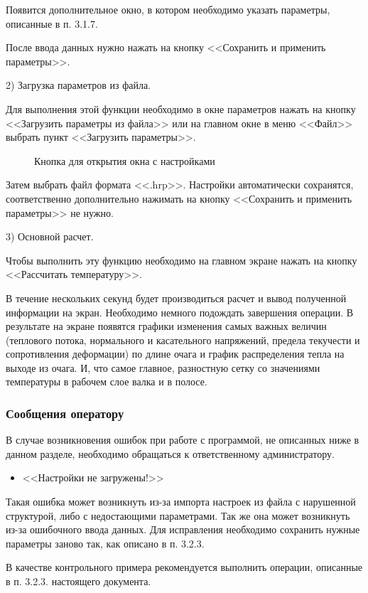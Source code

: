 Появится дополнительное окно, в котором необходимо указать параметры, описанные в п. 3.1.7.

После ввода данных нужно нажать на кнопку <<Сохранить и применить параметры>>.

2) Загрузка параметров из файла.

Для выполнения этой функции необходимо в окне параметров нажать на кнопку <<Загрузить параметры из файла>> или на главном окне в меню <<Файл>> выбрать пункт <<Загрузить параметры>>.

\begin{figure}[h] 
\label{21} 
\begin{minipage}[h]{0.49\linewidth} 
\center{\texttt{[image: 20]} \\} 
\end{minipage} 
\hfill 
\begin{minipage}[h]{0.49\linewidth} 
\center{\texttt{[image: 21]} \\ } 
\end{minipage} 
\caption{Кнопка для открытия окна с настройками} 
\end{figure}

Затем выбрать файл формата <<.hrp>>. Настройки автоматически сохранятся, соответственно дополнительно нажимать на кнопку <<Сохранить и применить параметры>> не нужно.

3) Основной расчет.

Чтобы выполнить эту функцию необходимо на главном экране нажать на кнопку <<Рассчитать температуру>>.

В течение нескольких секунд будет производиться расчет и вывод полученной информации на экран. Необходимо немного подождать завершения операции. В результате на экране появятся графики изменения самых важных величин (теплового потока, нормального и касательного напряжений, предела текучести и сопротивления деформации) по длине очага и график распределения тепла на выходе из очага. И, что самое главное, разностную сетку со значениями температуры в рабочем слое валка и в полосе.

\subsubsection{Сообщения оператору}
В случае возникновения ошибок при работе с программой, не описанных ниже в данном разделе, необходимо обращаться к ответственному администратору.

\begin{itemize}
\item <<Настройки не загружены!>>
\end{itemize}

Такая ошибка может возникнуть из-за импорта настроек из файла с нарушенной структурой, либо с недостающими параметрами. Так же она может возникнуть из-за ошибочного ввода данных. Для исправления необходимо сохранить нужные параметры заново так, как описано в п. 3.2.3.

В качестве контрольного примера рекомендуется выполнить операции, описанные в п. 3.2.3. настоящего документа.

\newpage